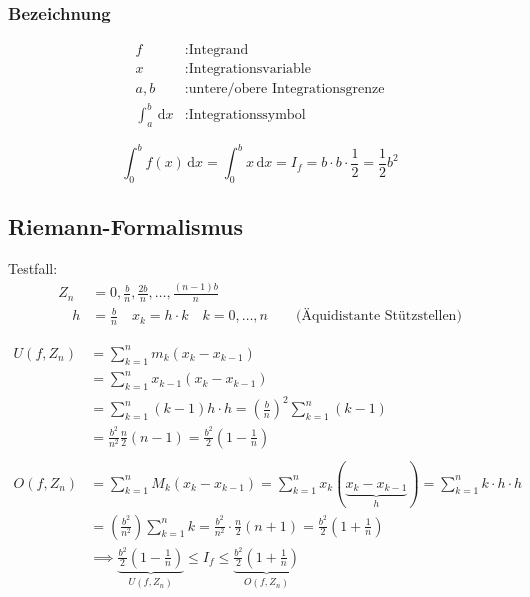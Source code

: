 \subsubsection{Bezeichnung}
\begin{align*}
	f&: \text{Integrand} \\
	x&: \text{Integrationsvariable}\\
	a,b&: \text{untere/obere Integrationsgrenze}\\	
	\int_a^b \,\mathrm{d}x &:\text{Integrationssymbol}
\end{align*}

\begin{example}[f(x)=x in \lbrack0,b\rbrack]
	\[
		\int_0^b f(x) \,\mathrm{d}x = \int_0^b x \,\mathrm{d}x = I_f = b \cdot b \cdot \frac{1}{2} = \frac{1}{2} b^2
	\]
\end{example}


\begin{center}
\end{center}


\subsection{Riemann-Formalismus}
Testfall:
\begin{align*}
	Z_n &= {0,\frac{b}{n},\frac{2b}{n},\ldots,\frac{(n-1)b}{n}} \\
	\quad h &= \frac{b}{n} \quad x_k=h \cdot k \quad k=0,\ldots,n \qquad \text{(Äquidistante Stützstellen)} 
\end{align*}

\begin{align*}
	U(f,Z_n) 
	&= \sum_{k=1}^n m_k(x_k-x_{k-1}) \\
	&= \sum_{k=1}^n x_{k-1}(x_k-x_{k-1}) \\
	&= \sum_{k=1}^n (k-1)h \cdot h = \left( \frac{b}{n} \right)^2 \sum_{k=1}^n (k-1) \\
	&= \frac{b^2}{n^2} \frac{n}{2}(n-1) = \frac{b^2}{2}(1-\frac{1}{n}) \\
	\\
	O(f,Z_n)
	&=\sum_{k=1}^n M_k(x_k-x_{k-1}) = \sum_{k=1}^n x_k(\underbrace{x_k-x_{k-1}}_{h}) = \sum_{k=1}^n k \cdot h \cdot h \\
	&= \left(\frac{b^2}{n^2}\right)\sum_{k=1}^n k = \frac{b^2}{n^2} \cdot \frac{n}{2}(n+1) = \frac{b^2}{2}(1+\frac{1}{n}) \\
	&\implies \underbrace{ \frac{b^2}{2}(1-\frac{1}{n}) }_{U(f,Z_n)}\leq I_f \leq \underbrace{\frac{b^2}{2}(1+\frac{1}{n})}_{O(f,Z_n)}
\end{align*}

